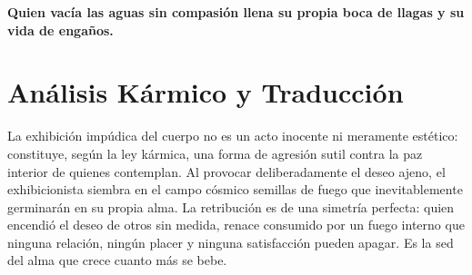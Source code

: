 
\vspace{1em}
\begin{center}
    \textbf{\Large Quien vacía las aguas sin compasión llena su propia boca de llagas y su vida de engaños.}
\end{center}
\vspace{1em}

\section{Análisis Kármico y Traducción}
\begin{figure}
  \vspace{-1.5em}
  \begin{center}
  \end{center}
  \vspace{-1.5em}
\end{figure}
La exhibición impúdica del cuerpo no es un acto inocente ni meramente estético: constituye, según la ley kármica, una forma de agresión sutil contra la paz interior de quienes contemplan. Al provocar deliberadamente el deseo ajeno, el exhibicionista siembra en el campo cósmico semillas de fuego que inevitablemente germinarán en su propia alma. La retribución es de una simetría perfecta: quien encendió el deseo de otros sin medida, renace consumido por un fuego interno que ninguna relación, ningún placer y ninguna satisfacción pueden apagar. Es la sed del alma que crece cuanto más se bebe.

